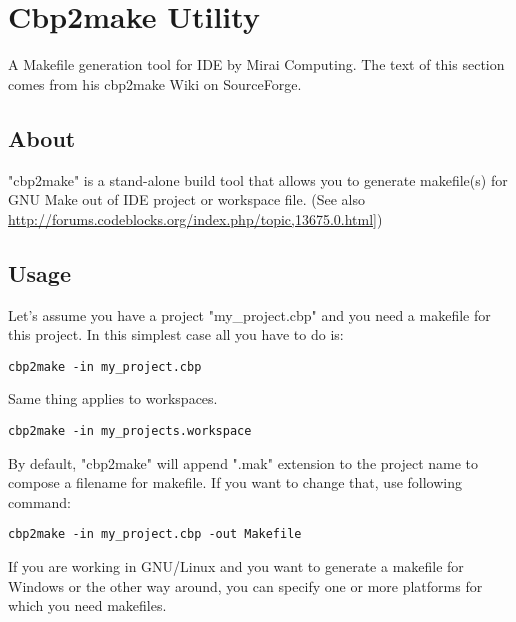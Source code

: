 \section{Cbp2make Utility}\label{sec:cbp2make}

A Makefile generation tool for \codeblocks IDE by Mirai Computing. The text of this section comes from his cbp2make Wiki on SourceForge.

\subsection{About}

"cbp2make" is a stand-alone build tool that allows you to generate makefile(s) for GNU Make out of \codeblocks IDE project or workspace file. (See also \url{http://forums.codeblocks.org/index.php/topic,13675.0.html]})

\subsection{Usage}

Let's assume you have a project "my\_project.cbp" and you need a makefile for this project. In this simplest case all you have to do is:
\begin{lstlisting}
cbp2make -in my_project.cbp
\end{lstlisting}

Same thing applies to workspaces.
\begin{lstlisting}
cbp2make -in my_projects.workspace
\end{lstlisting}

By default, "cbp2make" will append ".mak" extension to the project name to compose a filename for makefile.
If you want to change that, use following command:

\begin{lstlisting}
cbp2make -in my_project.cbp -out Makefile
\end{lstlisting}

If you are working in GNU/Linux and you want to generate a makefile for Windows or the other way around, you can specify one or more platforms for which you need makefiles.

